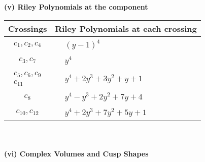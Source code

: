 \documentclass[1p]{elsarticle_modified}
\theoremstyle{definition}
\begin{document}
\newpage\renewcommand{\arraystretch}{1}
\flushleft \textbf{(v) Riley Polynomials at the component}\newline \\
\begin{tabular}{m{50pt}|m{274pt}}
Crossings & \hspace{64pt}Riley Polynomials at each crossing \\
\hline $$\begin{aligned}c_{1},c_{2},c_{4}\end{aligned}$$&$\begin{aligned}
&(y-1)^4
\end{aligned}$\\
\hline $$\begin{aligned}c_{3},c_{7}\end{aligned}$$&$\begin{aligned}
&y^4
\end{aligned}$\\
\hline $$\begin{aligned}c_{5},c_{6},c_{9}\\c_{11}\end{aligned}$$&$\begin{aligned}
&y^4+2 y^3+3 y^2+y+1
\end{aligned}$\\
\hline $$\begin{aligned}c_{8}\end{aligned}$$&$\begin{aligned}
&y^4- y^3+2 y^2+7 y+4
\end{aligned}$\\
\hline $$\begin{aligned}c_{10},c_{12}\end{aligned}$$&$\begin{aligned}
&y^4+2 y^3+7 y^2+5 y+1
\end{aligned}$\\
\hline
\end{tabular}\\~\\
\newpage\flushleft \textbf{(vi) Complex Volumes and Cusp Shapes}
\end{document}
